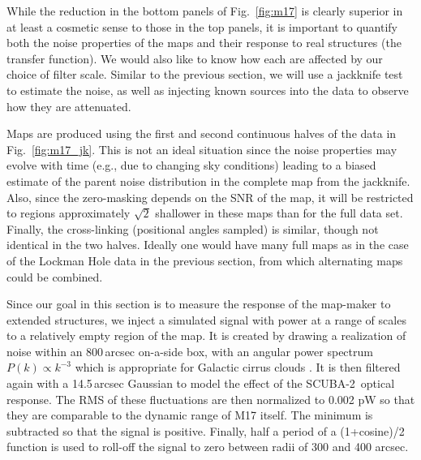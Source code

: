 \documentclass[useAMS,usenatbib,nofootinbib]{mn2e}
\newcommand{\scuba}{SCUBA-2}
\begin{document}
While the reduction in the bottom panels of Fig.~\ref{fig:m17} is
clearly superior in at least a cosmetic sense to those in the top
panels, it is important to quantify both the noise properties of the
maps and their response to real structures (the transfer function). We
would also like to know how each are affected by our choice of filter
scale.  Similar to the previous section, we will use a jackknife test
to estimate the noise, as well as injecting known sources into the
data to observe how they are attenuated.

Maps are produced using the first and second continuous halves of the
data in Fig.~\ref{fig:m17_jk}. This is not an ideal situation since
the noise properties may evolve with time (e.g., due to changing sky
conditions) leading to a biased estimate of the parent noise
distribution in the complete map from the jackknife. Also, since the
zero-masking depends on the SNR of the map, it will be restricted to
regions approximately $\sqrt{2}$ shallower in these maps than for the
full data set. Finally, the cross-linking (positional angles sampled)
is similar, though not identical in the two halves. Ideally one would
have many full maps as in the case of the Lockman Hole data in the
previous section, from which alternating maps could be combined.

Since our goal in this section is to measure the response of the
map-maker to extended structures, we inject a simulated signal with
power at a range of scales to a relatively empty region of the map.
It is created by drawing a realization of noise within an 800\,arcsec
on-a-side box, with an angular power spectrum $P(k) \propto k^{-3}$
which is appropriate for Galactic cirrus clouds
\citep[e.g.][]{gautier1992}. It is then filtered again with a
14.5\,arcsec Gaussian to model the effect of the \scuba\ optical
response. The RMS of these fluctuations are then normalized to 0.002
pW so that they are comparable to the dynamic range of M17 itself. The
minimum is subtracted so that the signal is positive. Finally, half a
period of a (1+cosine)/2 function is used to roll-off the signal to
zero between radii of 300 and 400 arcsec.
\end{document}
